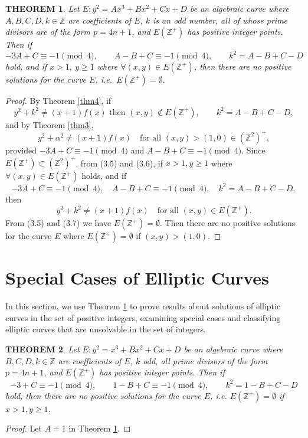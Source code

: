 \documentclass[11pt]{amsart}
\newtheorem{theorem}{THEOREM}
\begin{document}
\begin{theorem}\label{thm5}
Let $E: y^2=Ax^3+Bx^2+Cx+D$ be an algebraic curve where $A,B,C,D,k\in\mathbb{Z}$ are coefficients of $E$, $k$ is an odd number, all of whose prime divisors are of the form $p=4n+1$, and $E(\mathbb{Z}^+)$ has positive integer points. Then if
\[
-3A+C\equiv -1\pmod4,\qquad A-B+C\equiv-1\pmod4, \qquad k^2=A-B+C-D
\]
hold, and if $x>1,\ y\ge1$ where $\forall (x,y)\in E(\mathbb{Z}^+)$, then there are no positive solutions for the curve $E$, i.e.\ $E(\mathbb{Z}^+)=\emptyset$.
\end{theorem}

\begin{proof}
By Theorem \ref{thm4}, if
\begin{equation}
y^2+k^2\ne (x+1)f(x) \text{ then } (x,y)\notin E(\mathbb{Z}^+), \qquad k^2=A-B+C-D, \tag{3.5}
\end{equation}
and by Theorem \ref{thm3},
\begin{equation}
y^2+\alpha^2 \ne (x+1)f(x) \quad\text{for all } (x,y)>(1,0)\in(\mathbb{Z}^2)^+, \tag{3.6}
\end{equation}
provided $-3A+C\equiv-1\pmod4$ and $A-B+C\equiv-1\pmod4$. Since $E(\mathbb{Z}^+)\subset(\mathbb{Z}^2)^+$, from (3.5) and (3.6), if $x>1,y\ge1$ where $\forall(x,y)\in E(\mathbb{Z}^+)$ holds, and if
\[
-3A+C\equiv-1\pmod4,\quad A-B+C\equiv-1\pmod4,\quad k^2=A-B+C-D,
\]
then
\begin{equation}
y^2+k^2 \ne (x+1)f(x) \quad\text{for all } (x,y)\in E(\mathbb{Z}^+). \tag{3.7}
\end{equation}
From (3.5) and (3.7) we have $E(\mathbb{Z}^+)=\emptyset$. Then there are no positive solutions for the curve $E$ where $E(\mathbb{Z}^+)=\emptyset$ if $(x,y)>(1,0)$. \qedhere
\end{proof}

\section{Special Cases of Elliptic Curves}

In this section, we use Theorem \ref{thm5} to prove results about solutions of elliptic curves in the set of positive integers, examining special cases and classifying elliptic curves that are unsolvable in the set of integers.

\begin{theorem}\label{thm6}
Let $E: y^2=x^3+Bx^2+Cx+D$ be an algebraic curve where $B,C,D,k\in\mathbb{Z}$ are coefficients of $E$, $k$ odd, all prime divisors of the form $p=4n+1$, and $E(\mathbb{Z}^+)$ has positive integer points. Then if
\[
-3+C\equiv-1\pmod4,\qquad 1-B+C\equiv-1\pmod4,\qquad k^2=1-B+C-D
\]
hold, then there are no positive solutions for the curve $E$, i.e. $E(\mathbb{Z}^+)=\emptyset$ if $x>1,y\ge1$.
\end{theorem}
\begin{proof}
Let $A=1$ in Theorem \ref{thm5}.
\end{proof}
\end{document}
